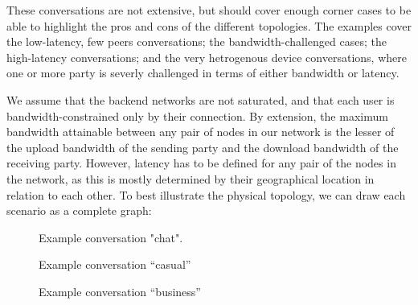 These conversations are not extensive, but should cover enough corner cases to be able to highlight the pros and cons of the different topologies. The examples cover the low-latency, few peers conversations; the bandwidth-challenged cases; the high-latency conversations; and the very hetrogenous device conversations, where one or more party is severly challenged in terms of either bandwidth or latency.

We assume that the backend networks are not saturated, and that each user is bandwidth-constrained only by their connection. By extension, the maximum bandwidth attainable between any pair of nodes in our network is the lesser of the upload bandwidth of the sending party and the download bandwidth of the receiving party. However, latency has to be defined for any pair of the nodes in the network, as this is mostly determined by their geographical location in relation to each other. To best illustrate the physical topology, we can draw each scenario as a complete graph:

\begin{figure}[ht!]
\centering
    \caption{Example conversation "chat".}\label{fig:example-conv-chat}
\end{figure}

\begin{figure}[ht!]
\centering
    \caption{Example conversation ``casual''}\label{fig:example-conv-casual}
\end{figure}

\begin{figure}[ht!]
\centering
    \caption{Example conversation ``business''}\label{fig:example-conv-business}
\end{figure}

